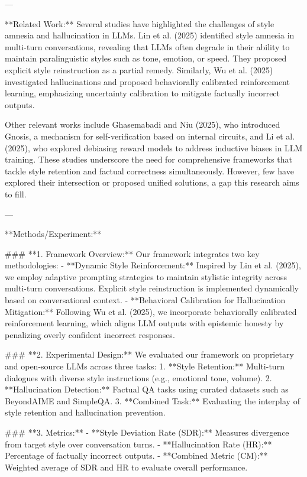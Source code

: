 ---

**Related Work:**  
Several studies have highlighted the challenges of style amnesia and hallucination in LLMs. Lin et al. (2025) identified style amnesia in multi-turn conversations, revealing that LLMs often degrade in their ability to maintain paralinguistic styles such as tone, emotion, or speed. They proposed explicit style reinstruction as a partial remedy. Similarly, Wu et al. (2025) investigated hallucinations and proposed behaviorally calibrated reinforcement learning, emphasizing uncertainty calibration to mitigate factually incorrect outputs.

Other relevant works include Ghasemabadi and Niu (2025), who introduced Gnosis, a mechanism for self-verification based on internal circuits, and Li et al. (2025), who explored debiasing reward models to address inductive biases in LLM training. These studies underscore the need for comprehensive frameworks that tackle style retention and factual correctness simultaneously. However, few have explored their intersection or proposed unified solutions, a gap this research aims to fill.

---

**Methods/Experiment:**  

### **1. Framework Overview:**  
Our framework integrates two key methodologies:  
- **Dynamic Style Reinforcement:** Inspired by Lin et al. (2025), we employ adaptive prompting strategies to maintain stylistic integrity across multi-turn conversations. Explicit style reinstruction is implemented dynamically based on conversational context.  
- **Behavioral Calibration for Hallucination Mitigation:** Following Wu et al. (2025), we incorporate behaviorally calibrated reinforcement learning, which aligns LLM outputs with epistemic honesty by penalizing overly confident incorrect responses.  

### **2. Experimental Design:**  
We evaluated our framework on proprietary and open-source LLMs across three tasks:  
1. **Style Retention:** Multi-turn dialogues with diverse style instructions (e.g., emotional tone, volume).  
2. **Hallucination Detection:** Factual QA tasks using curated datasets such as BeyondAIME and SimpleQA.  
3. **Combined Task:** Evaluating the interplay of style retention and hallucination prevention.

### **3. Metrics:**  
- **Style Deviation Rate (SDR):** Measures divergence from target style over conversation turns.  
- **Hallucination Rate (HR):** Percentage of factually incorrect outputs.  
- **Combined Metric (CM):** Weighted average of SDR and HR to evaluate overall performance.  

